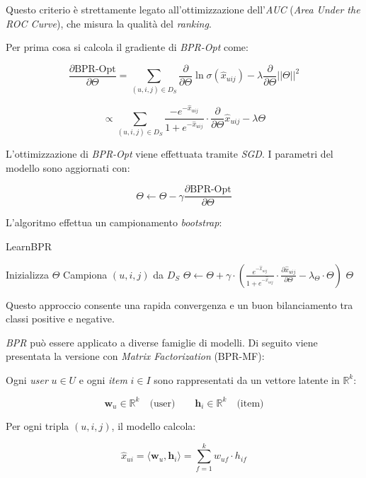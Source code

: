 Questo criterio è strettamente legato all'ottimizzazione dell'\textit{AUC} (\textit{Area Under the ROC Curve}), che misura la qualità del \textit{ranking}.

Per prima cosa si calcola il gradiente di \textit{BPR-Opt} come:

\[
\frac{\partial \text{BPR-Opt}}{\partial \Theta} =
\sum_{(u,i,j) \in D_S} 
\frac{\partial}{\partial \Theta} \ln \sigma(\hat{x}_{uij}) - 
\lambda \frac{\partial}{\partial \Theta} ||\Theta||^2
\]

\[
\propto 
\sum_{(u,i,j) \in D_S} 
\frac{-e^{-\hat{x}_{uij}}}{1 + e^{-\hat{x}_{uij}}} 
\cdot \frac{\partial}{\partial \Theta} \hat{x}_{uij} 
- \lambda \Theta
\]

L'ottimizzazione di \textit{BPR-Opt} viene effettuata tramite \textit{SGD}. I parametri del modello sono aggiornati con:

\[
\Theta \gets \Theta - \gamma \frac{\partial \text{BPR-Opt}}{\partial \Theta}
\]


L'algoritmo effettua un campionamento \textit{bootstrap}:

\begin{algorithm}[H]
\caption{LearnBPR}
\begin{algorithmic}[1]
    \State Inizializza $\Theta$
    \Repeat
        \State Campiona $(u, i, j)$ da $D_S$
        \State $\Theta \gets \Theta + \gamma \cdot \left( \frac{e^{-\hat{x}_{uij}}}{1 + e^{-\hat{x}_{uij}}} \cdot \frac{\partial \hat{x}_{uij}}{\partial \Theta} - \lambda_\Theta \cdot \Theta \right)$
    \State \Return $\Theta$
\EndProcedure
\end{algorithmic}
\end{algorithm}

Questo approccio consente una rapida convergenza e un buon bilanciamento tra classi positive e negative.

\textit{BPR} può essere applicato a diverse famiglie di modelli. Di seguito viene presentata la versione con \textit{Matrix Factorization} (BPR-MF):

Ogni \textit{user} \( u \in U \) e ogni \textit{item} \( i \in I \) sono rappresentati da un vettore latente in \( \mathbb{R}^k \):

\[
\mathbf{w}_u \in \mathbb{R}^k \quad \text{(user)} \qquad
\mathbf{h}_i \in \mathbb{R}^k \quad \text{(item)}
\]


Per ogni tripla \( (u, i, j) \), il modello calcola:

\[
\hat{x}_{ui} = \langle \mathbf{w}_u, \mathbf{h}_i \rangle = \sum_{f=1}^{k} w_{uf} \cdot h_{if}
\]


